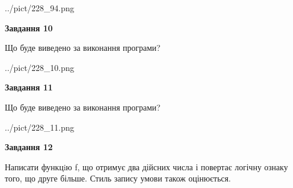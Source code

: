 \documentclass[12pt, ukrainian]{article}
\begin{document}
{\begin {large}
\begin{center}
	{../pict/228_94.png}
\end{center}
\newpage

{\begin {center}\textbf{Завдання 10}\end {center}}

Що буде виведено за виконання програми?\par
\begin{center}
	{../pict/228_10.png}
\end{center}
\newpage

{\begin {center}\textbf{Завдання 11}\end {center}}

Що буде виведено за виконання програми?\par
\begin{center}
	{../pict/228_11.png}
\end{center}
\newpage

{\begin {center}\textbf{Завдання 12}\end {center}}


Написати функцiю f, що отримує два дійсних числа і повертає логічну ознаку того, що друге більше. Стиль запису умови також оцінюється.\par
\newpage

\end {large}}
\end{document}
